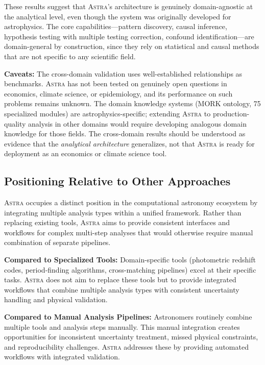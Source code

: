 \documentclass[usenatbib]{rasti}
\newcommand{\astra}{\textsc{Astra}\xspace}
\begin{document}
These results suggest that \astra's architecture is genuinely domain-agnostic at the analytical level, even though the system was originally developed for astrophysics.
The core capabilities---pattern discovery, causal inference, hypothesis testing with multiple testing correction, confound identification---are domain-general by construction, since they rely on statistical and causal methods that are not specific to any scientific field.

\textbf{Caveats:}
The cross-domain validation uses well-established relationships as benchmarks. \astra has not been tested on genuinely open questions in economics, climate science, or epidemiology, and its performance on such problems remains unknown.
The domain knowledge systems (MORK ontology, 75 specialized modules) are astrophysics-specific; extending \astra to production-quality analysis in other domains would require developing analogous domain knowledge for those fields.
The cross-domain results should be understood as evidence that the \emph{analytical architecture} generalizes, not that \astra is ready for deployment as an economics or climate science tool.

\subsection{Positioning Relative to Other Approaches}
\label{sec:discussion:positioning}

\astra occupies a distinct position in the computational astronomy ecosystem by integrating multiple analysis types within a unified framework.
Rather than replacing existing tools, \astra aims to provide consistent interfaces and workflows for complex multi-step analyses that would otherwise require manual combination of separate pipelines.

\textbf{Compared to Specialized Tools:}
Domain-specific tools (photometric redshift codes, period-finding algorithms, cross-matching pipelines) excel at their specific tasks.
\astra does not aim to replace these tools but to provide integrated workflows that combine multiple analysis types with consistent uncertainty handling and physical validation.

\textbf{Compared to Manual Analysis Pipelines:}
Astronomers routinely combine multiple tools and analysis steps manually.
This manual integration creates opportunities for inconsistent uncertainty treatment, missed physical constraints, and reproducibility challenges.
\astra addresses these by providing automated workflows with integrated validation.
\end{document}
